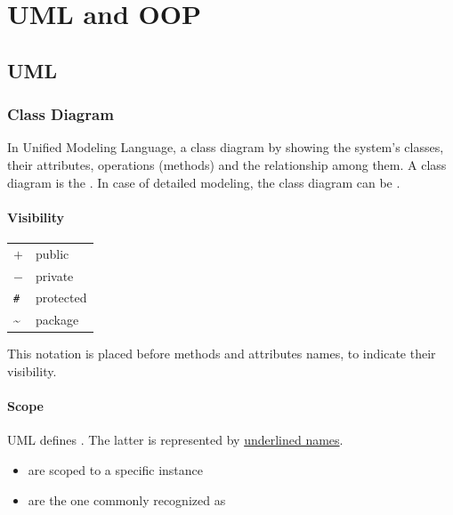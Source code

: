 \chapter{UML and OOP}
\label{chap:c++newfeatures}

\section{UML}
    \subsection{Class Diagram}
    In Unified Modeling Language, a class diagram  by showing the system's classes, 
    their attributes, operations (methods) and the relationship among 
    them.
    \newline
    A class diagram is the .
    \newline
    In case of detailed modeling, 
    the class diagram can be .
    \subsubsection{Visibility}
    \vspace{-0.5cm}
    \begin{table}[ht]
        \begin{tabular}{l l}
            $+$ \quad \quad & public\\
            $-$ & private\\
            \texttt{\#} & protected\\
            \textasciitilde & package\\
        \end{tabular}
    \end{table}
    This notation is placed before methods and attributes names, 
    to indicate their visibility. 
    
    \subsubsection{Scope}
    UML defines .
    \newline
    The latter is represented by \underline{underlined names}.
    \begin{itemize}
        \item {} are scoped to a specific instance
        \item {} are the one commonly recognized as 
    \end{itemize}
